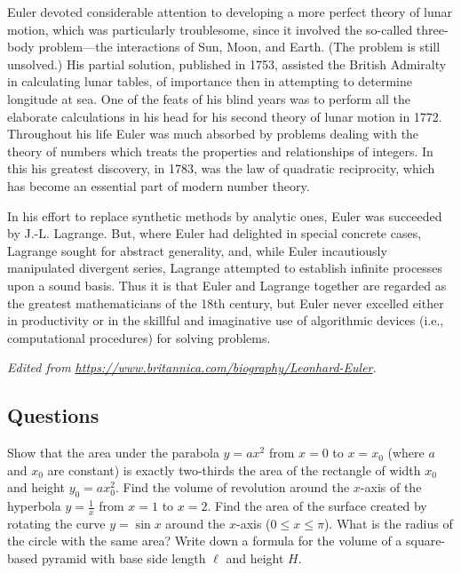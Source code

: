 Euler devoted considerable attention to developing a more perfect theory of lunar motion, which was particularly troublesome, since it involved the so-called three-body problem—the interactions of Sun, Moon, and Earth. (The problem is still unsolved.) His partial solution, published in 1753, assisted the British Admiralty in calculating lunar tables, of importance then in attempting to determine longitude at sea. One of the feats of his blind years was to perform all the elaborate calculations in his head for his second theory of lunar motion in 1772. Throughout his life Euler was much absorbed by problems dealing with the theory of numbers which treats the properties and relationships of integers. In this his greatest discovery, in 1783, was the law of quadratic reciprocity, which has become an essential part of modern number theory.

In his effort to replace synthetic methods by analytic ones, Euler was succeeded by J.-L. Lagrange. But, where Euler had delighted in special concrete cases, Lagrange sought for abstract generality, and, while Euler incautiously manipulated divergent series, Lagrange attempted to establish infinite processes upon a sound basis. Thus it is that Euler and Lagrange together are regarded as the greatest mathematicians of the 18th century, but Euler never excelled either in productivity or in the skillful and imaginative use of algorithmic devices (i.e., computational procedures) for solving problems.

\textit{Edited from \url{https://www.britannica.com/biography/Leonhard-Euler}.}

\subsection*{Questions}
\begin{questions}
  \question Show that the area under the parabola $ y = ax^2 $ from $ x = 0 $ to $ x = x_0 $ (where $ a $ and $ x_0 $ are constant)
            is exactly two-thirds the area of the rectangle of width $ x_0 $ and height $ y_0 = ax_0^2 $.
  \question Find the volume of revolution around the $ x$-axis of the hyperbola $ y = \frac{1}{x} $ from $ x = 1 $ to $ x = 2 $.
  \question Find the area of the surface created by rotating the curve $ y = \sin x $ around the $ x$-axis ($ 0 \leq x \leq \pi $).
            What is the radius of the circle with the same area?
  \question Write down a formula for the volume of a square-based pyramid with base side length $ \ell $ and height $ H $.
\end{questions}


